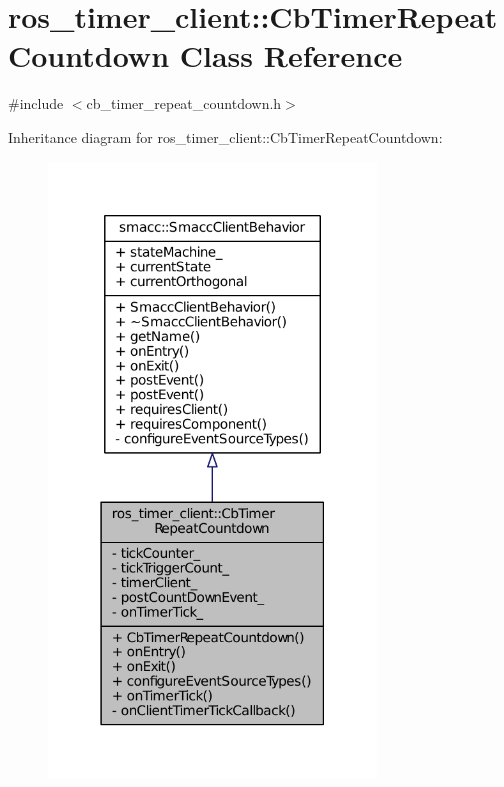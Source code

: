 \hypertarget{classros__timer__client_1_1CbTimerRepeatCountdown}{}\section{ros\+\_\+timer\+\_\+client\+:\+:Cb\+Timer\+Repeat\+Countdown Class Reference}
\label{classros__timer__client_1_1CbTimerRepeatCountdown}


{\ttfamily \#include $<$cb\+\_\+timer\+\_\+repeat\+\_\+countdown.\+h$>$}



Inheritance diagram for ros\+\_\+timer\+\_\+client\+:\+:Cb\+Timer\+Repeat\+Countdown\+:
\nopagebreak
\begin{figure}[H]
\begin{center}
\leavevmode
\includegraphics[width=247pt]{classros__timer__client_1_1CbTimerRepeatCountdown__inherit__graph}
\end{center}
\end{figure}


